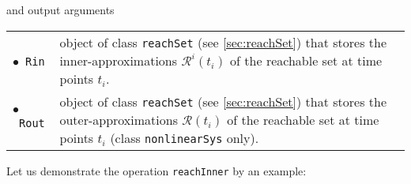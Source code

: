 and output arguments

\begin{center}
\renewcommand{\arraystretch}{1.3}
\begin{tabular}[t]{l p{13cm} }
	$\bullet$~\texttt{Rin} & object of class \texttt{reachSet} (see \cref{sec:reachSet}) that stores the inner-approximations $\mathcal{R}^i(t_i)$ of the reachable set at time points $t_i$. \\
	$\bullet$~\texttt{Rout} & object of class \texttt{reachSet} (see \cref{sec:reachSet}) that stores the outer-approximations $\mathcal{R}(t_i)$ of the reachable set at time points $t_i$ (class \texttt{nonlinearSys} only).
\end{tabular}
\end{center}


Let us demonstrate the operation \texttt{reachInner} by an example:

\begin{center}
\begin{minipage}[t]{0.58\textwidth}
	\footnotesize
	
\end{minipage}
\begin{minipage}[t]{0.4\textwidth}
	\vspace{0pt}
	\centering
\end{minipage}
\end{center}